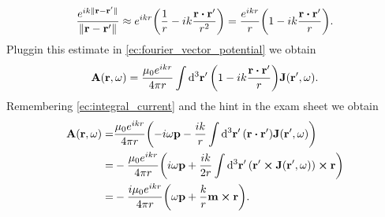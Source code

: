 \documentclass{article}
\begin{document}
\begin{enumerate}[(i)]
\begin{equation}
\frac{e^{ik\|\vb{r}-\vb{r}'\|}}{\|\vb{r}-\vb{r}'\|}\approx e^{ikr}\qty(\frac{1}{r}-ik\frac{\vb{r}\vdot\vb{r}'}{r^2})=\frac{e^{ikr}}{r}\qty(1-ik\frac{\vb{r}\vdot\vb{r}'}{r}).
\end{equation}
Pluggin this estimate in \eqref{ec:fourier_vector_potential} we obtain
\begin{equation}
\vb{A}(\vb{r},\omega)=\frac{\mu_0e^{ikr}}{4\pi r}\int \dd[3]{\vb{r}'}\qty(1-ik\frac{\vb{r}\vdot\vb{r}'}{r})\vb{J}(\vb{r}',\omega).
\end{equation}
Remembering \eqref{ec:integral_current} and the hint in the exam sheet we obtain
\begin{align}
\begin{split}\label{ec:magnetic_potential}
\vb{A}(\vb{r},\omega)=&\frac{\mu_0e^{ikr}}{4\pi r}\qty(-i\omega\vb{p}-\frac{ik}{r}\int\dd[3]{\vb{r}'}(\vb{r}\vdot\vb{r}')\vb{J}(\vb{r}',\omega))\\
=&-\frac{\mu_0e^{ikr}}{4\pi r}\qty(i\omega\vb{p}+\frac{ik}{2r}\int\dd[3]{\vb{r}'}(\vb{r}'\cross\vb{J}(\vb{r}',\omega))\cross\vb{r})\\
=&-\frac{i\mu_0e^{ikr}}{4\pi r}\qty(\omega\vb{p}+\frac{k}{r}\vb{m}\cross\vb{r}).
\end{split}
\end{align}


\end{enumerate}
\end{document}
